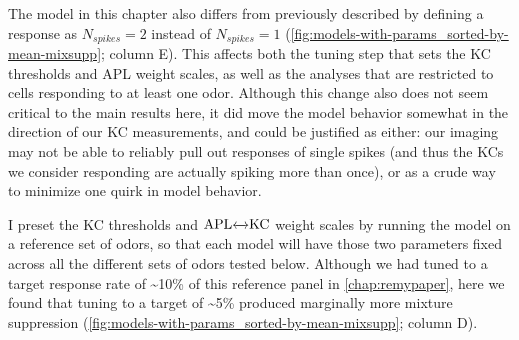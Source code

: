 \documentclass[12pt]{caltech_thesis}
\newcommand{\NSpikes}{\ensuremath{N_{spikes}}}
\newcommand{\APLKC}{\ensuremath{\text{APL}{\xleftrightarrow{}}\text{KC }}}
\begin{document}
\begin{refsection}
The model in this chapter also differs from previously described by defining a response as $\NSpikes{=}2$ instead of $\NSpikes{=}1$ (\cref{fig:models-with-params_sorted-by-mean-mixsupp}; column E).
This affects both the tuning step that sets the KC thresholds and APL weight scales, as well as the analyses that are restricted to cells responding to at least one odor.
Although this change also does not seem critical to the main results here, it did move the model behavior somewhat in the direction of our KC measurements, and could be justified as either: our imaging may not be able to reliably pull out responses of single spikes (and thus the KCs we consider responding are actually spiking more than once), or as a crude way to minimize one quirk in model behavior.

I preset the KC thresholds and \APLKC weight scales by running the model on a reference set of odors, so that each model will have those two parameters fixed across all the different sets of odors tested below.
Although we had tuned to a target response rate of \textasciitilde10\% of this reference panel in \autoref{chap:remypaper}, here we found that tuning to a target of \textasciitilde5\% produced marginally more mixture suppression (\cref{fig:models-with-params_sorted-by-mean-mixsupp}; column D).



\end{refsection}
\end{document}

